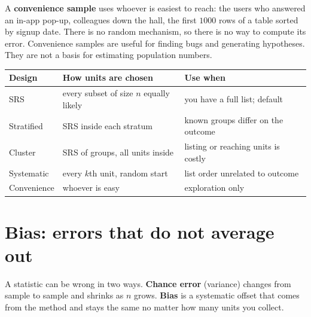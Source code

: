 A \textbf{convenience sample} uses whoever is easiest to reach: the users who answered an
in-app pop-up, colleagues down the hall, the first $1000$ rows of a table sorted by
signup date. There is no random mechanism, so there is no way to compute its error.
Convenience samples are useful for finding bugs and generating hypotheses. They are not
a basis for estimating population numbers.

\begin{center}
\renewcommand{\arraystretch}{1.2}
\begin{tabular}{@{}>{\raggedright\arraybackslash}p{2.4cm}>{\raggedright\arraybackslash}p{4.6cm}>{\raggedright\arraybackslash}p{5.6cm}@{}}
\toprule
Design & How units are chosen & Use when \\
\midrule
SRS & every subset of size $n$ equally likely & you have a full list; default \\
Stratified & SRS inside each stratum & known groups differ on the outcome \\
Cluster & SRS of groups, all units inside & listing or reaching units is costly \\
Systematic & every $k$th unit, random start & list order unrelated to outcome \\
Convenience & whoever is easy & exploration only \\
\bottomrule
\end{tabular}
\end{center}

\section{Bias: errors that do not average out}
\label{sec:sampling-bias}

A statistic can be wrong in two ways. \textbf{Chance error} (variance) changes from sample
to sample and shrinks as $n$ grows. \textbf{Bias} is a systematic offset that comes from
the method and stays the same no matter how many units you collect.

